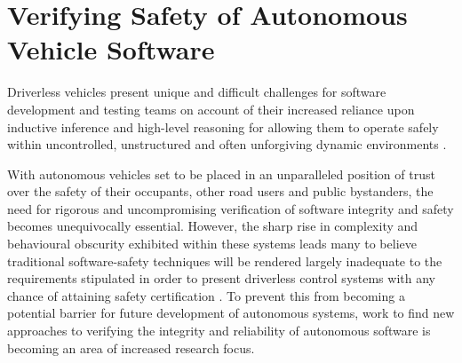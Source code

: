 \documentclass[conference]{IEEEtran}
\begin{document}




\section{Verifying Safety of Autonomous Vehicle Software}


Driverless vehicles present unique and difficult challenges for software development and testing teams on account of their increased reliance upon inductive inference and high-level reasoning for allowing them to operate safely within uncontrolled, unstructured and often unforgiving dynamic environments \cite{wagner-1}. 

 With autonomous vehicles set to be placed in an unparalleled position of trust over the safety of their occupants, other road users and public bystanders, the need for rigorous and uncompromising verification of software integrity and safety becomes unequivocally essential. However, the sharp rise in complexity and behavioural obscurity exhibited within these systems leads many to believe traditional software-safety techniques will be rendered largely inadequate to the requirements stipulated in order to present driverless control systems with any chance of attaining safety certification \cite{wagner-1, wagner-2, wongpiromsarn, fisher-1}. To prevent this from becoming a potential barrier for future development of autonomous systems, work to find new approaches to verifying the integrity and reliability of autonomous software is becoming an area of increased research focus. 
 
\end{document}

